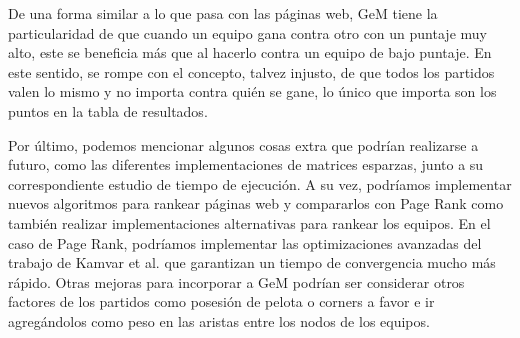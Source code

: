 De una forma similar a lo que pasa con las páginas web, GeM tiene la particularidad de que cuando un equipo gana contra otro
con un puntaje muy alto, este se beneficia más que al hacerlo contra un equipo de bajo puntaje. En este sentido, se rompe con el 
concepto, talvez injusto, de que todos los partidos valen lo mismo y no importa contra quién se gane, lo único que importa son los puntos en la tabla de resultados.

Por último, podemos mencionar algunos cosas extra que podrían realizarse a
futuro, como las diferentes implementaciones de matrices esparzas, 
junto a su correspondiente estudio de tiempo de ejecución. A su vez, podríamos implementar 
nuevos algoritmos para rankear páginas web y compararlos con Page Rank como también realizar implementaciones alternativas para rankear los equipos. En el caso de Page Rank, podríamos implementar las optimizaciones avanzadas del trabajo de Kamvar et al.\cite{Kamvar2003} que garantizan un tiempo de convergencia mucho más rápido. 
Otras mejoras para incorporar a GeM podrían ser considerar otros factores de los partidos como posesión de pelota o corners a favor e ir agregándolos como peso en las aristas entre los nodos de los equipos.

